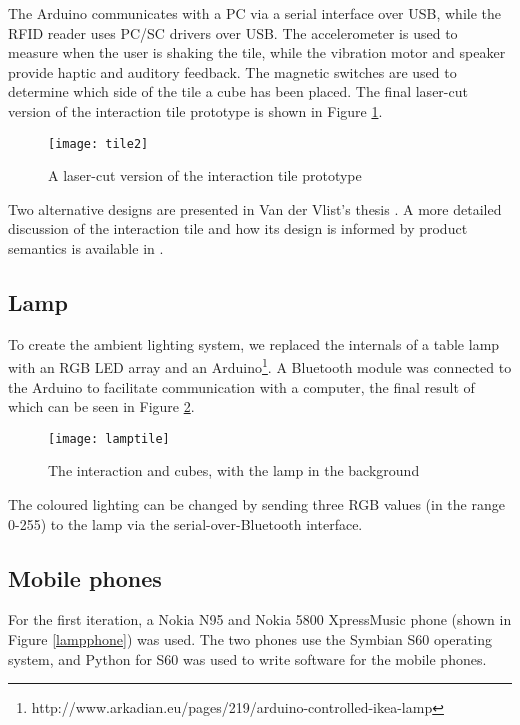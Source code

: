 The Arduino communicates with a PC via a serial interface over USB, while the \ac{RFID} reader uses \ac{PC/SC} drivers over USB. The accelerometer is used to measure when the user is shaking the tile, while the vibration motor and speaker provide haptic and auditory feedback. The magnetic switches are used to determine which side of the tile a cube has been placed. The final laser-cut version of the interaction tile prototype is shown in Figure \ref{tile2}.

\begin{figure}[bth]
\centering
\texttt{[image: tile2]}
\caption{A laser-cut version of the interaction tile prototype}
\label{tile2}
\end{figure}

Two alternative designs are presented in Van der Vlist's thesis \cite{Bram}. A more detailed discussion of the interaction tile and how its design is informed by product semantics is available in \cite{VanderVlist2010}. 

\subsection{Lamp}
\label{Lamp}
To create the ambient lighting system, we replaced the internals of a table lamp with an RGB LED array and an Arduino\footnote{ http://www.arkadian.eu/pages/219/arduino-controlled-ikea-lamp}. A Bluetooth module was connected to the Arduino to facilitate communication with a computer, the final result of which can be seen in Figure \ref{lamptile}. 

\begin{figure}[bth]
\centering
\texttt{[image: lamptile]}
\caption{The interaction and cubes, with the lamp in the background}
\label{lamptile}
\end{figure}

The coloured lighting can be changed by sending three RGB values (in the range 0-255) to the lamp via the serial-over-Bluetooth interface.

\subsection{Mobile phones}

For the first iteration, a Nokia N95 and Nokia 5800 XpressMusic phone (shown in Figure \ref{lampphone}) was used. The two phones use the Symbian S60 operating system, and Python for S60 was used to write software for the mobile phones.

